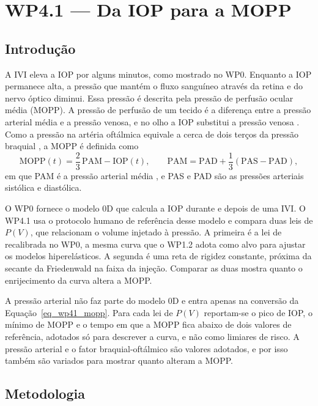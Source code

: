 \section{WP4.1 --- Da IOP para a MOPP}
\label{sec_wp41}

\subsection{Introdução}

A IVI eleva a IOP por alguns minutos, como mostrado no WP0. Enquanto a IOP permanece alta, a pressão que mantém o fluxo sanguíneo através da retina e do nervo óptico diminui. Essa pressão é descrita pela pressão de perfusão ocular média (MOPP). A pressão de perfusão de um tecido é a diferença entre a pressão arterial média e a pressão venosa, e no olho a IOP substitui a pressão venosa \citep{leske2009opp, oppopa2013}. Como a pressão na artéria oftálmica equivale a cerca de dois terços da pressão braquial \citep{oppopa2013}, a MOPP é definida como
\begin{equation}
\mathrm{MOPP}(t)=\frac{2}{3}\,\mathrm{PAM}-\mathrm{IOP}(t),
\qquad
\mathrm{PAM}=\mathrm{PAD}+\frac{1}{3}\left(\mathrm{PAS}-\mathrm{PAD}\right),
\label{eq_wp41_mopp}
\end{equation}
em que PAM é a pressão arterial média \citep{oppopa2013}, e PAS e PAD são as pressões arteriais sistólica e diastólica.

O WP0 fornece o modelo 0D que calcula a IOP durante e depois de uma IVI. O WP4.1 usa o protocolo humano de referência desse modelo e compara duas leis de $P(V)$, que relacionam o volume injetado à pressão. A primeira é a lei de \citet{friedenwald1937} recalibrada no WP0, a mesma curva que o WP1.2 adota como alvo para ajustar os modelos hiperelásticos. A segunda é uma reta de rigidez constante, próxima da secante da Friedenwald na faixa da injeção. Comparar as duas mostra quanto o enrijecimento da curva altera a MOPP.

A pressão arterial não faz parte do modelo 0D e entra apenas na conversão da Equação~\ref{eq_wp41_mopp}. Para cada lei de $P(V)$ reportam-se o pico de IOP, o mínimo de MOPP e o tempo em que a MOPP fica abaixo de dois valores de referência, adotados só para descrever a curva, e não como limiares de risco. A pressão arterial e o fator braquial-oftálmico são valores adotados, e por isso também são variados para mostrar quanto alteram a MOPP.

\subsection{Metodologia}

